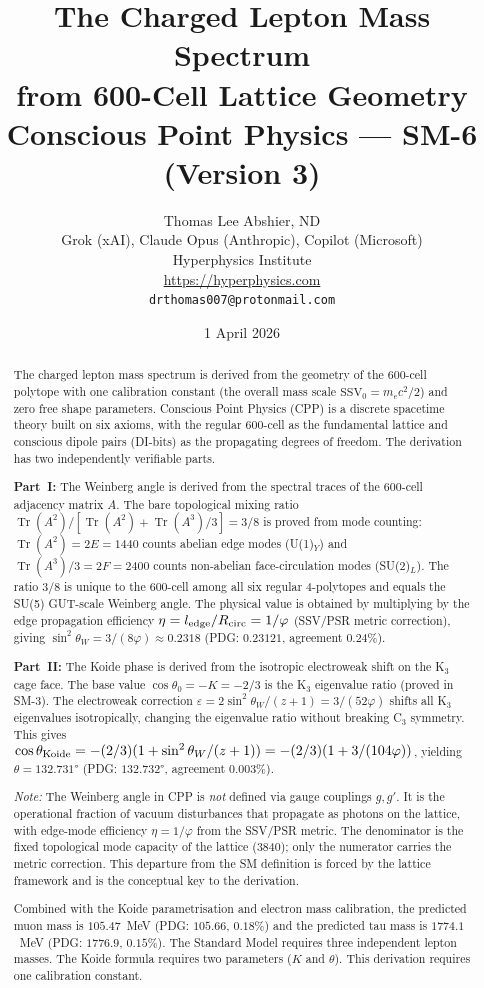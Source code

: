 \documentclass[11pt,letterpaper]{article}
\title{\textbf{The Charged Lepton Mass Spectrum\\from 600-Cell Lattice Geometry}\\[6pt]{\large Conscious Point Physics --- SM-6 (Version 3)}}
\author{Thomas Lee Abshier, ND\\Grok (xAI), Claude Opus (Anthropic), Copilot (Microsoft)\\Hyperphysics Institute\\\url{https://hyperphysics.com}\\\texttt{drthomas007@protonmail.com}}
\date{1 April 2026}
\newcommand{\SSV}{\mathrm{SSV}}
\newcommand{\phig}{\varphi}
\newcommand{\Tr}{\operatorname{Tr}}
\begin{document}
\maketitle
\begin{abstract}
The charged lepton mass spectrum is derived from the geometry of the 600-cell polytope with one calibration constant (the overall mass scale $\SSV_0 = m_e c^2/2$) and zero free shape parameters. Conscious Point Physics (CPP) is a discrete spacetime theory built on six axioms, with the regular 600-cell as the fundamental lattice and conscious dipole pairs (DI-bits) as the propagating degrees of freedom. The derivation has two independently verifiable parts.

\textbf{Part~I:} The Weinberg angle is derived from the spectral traces of the 600-cell adjacency matrix $A$. The bare topological mixing ratio $\Tr(A^2)/[\Tr(A^2) + \Tr(A^3)/3] = 3/8$ is proved from mode counting: $\Tr(A^2) = 2E = 1440$ counts abelian edge modes (U(1)$_Y$) and $\Tr(A^3)/3 = 2F = 2400$ counts non-abelian face-circulation modes (SU(2)$_L$). The ratio $3/8$ is unique to the 600-cell among all six regular 4-polytopes and equals the SU(5) GUT-scale Weinberg angle. The physical value is obtained by multiplying by the edge propagation efficiency $\eta = l_{\rm edge}/R_{\rm circ} = 1/\phig$ (SSV/PSR metric correction), giving $\sin^2\theta_W = 3/(8\phig) \approx 0.2318$ (PDG: $0.23121$, agreement $0.24\%$).

\textbf{Part~II:} The Koide phase is derived from the isotropic electroweak shift on the K$_3$ cage face. The base value $\cos\theta_0 = -K = -2/3$ is the K$_3$ eigenvalue ratio (proved in SM-3). The electroweak correction $\varepsilon = 2\sin^2\theta_W/(z+1) = 3/(52\phig)$ shifts all K$_3$ eigenvalues isotropically, changing the eigenvalue ratio without breaking C$_3$ symmetry. This gives $\cos\theta_{\rm Koide} = -(2/3)(1 + \sin^2\theta_W/(z+1)) = -(2/3)(1 + 3/(104\phig))$, yielding $\theta = 132.731°$ (PDG: $132.732°$, agreement $0.003\%$).

\emph{Note:} The Weinberg angle in CPP is \emph{not} defined via gauge couplings $g, g'$. It is the operational fraction of vacuum disturbances that propagate as photons on the lattice, with edge-mode efficiency $\eta = 1/\phig$ from the SSV/PSR metric. The denominator is the fixed topological mode capacity of the lattice (3840); only the numerator carries the metric correction. This departure from the SM definition is forced by the lattice framework and is the conceptual key to the derivation.

Combined with the Koide parametrisation and electron mass calibration, the predicted muon mass is $105.47$~MeV (PDG: $105.66$, $0.18\%$) and the predicted tau mass is $1774.1$~MeV (PDG: $1776.9$, $0.15\%$). The Standard Model requires three independent lepton masses. The Koide formula requires two parameters ($K$ and $\theta$). This derivation requires one calibration constant.
\end{abstract}
\end{document}
